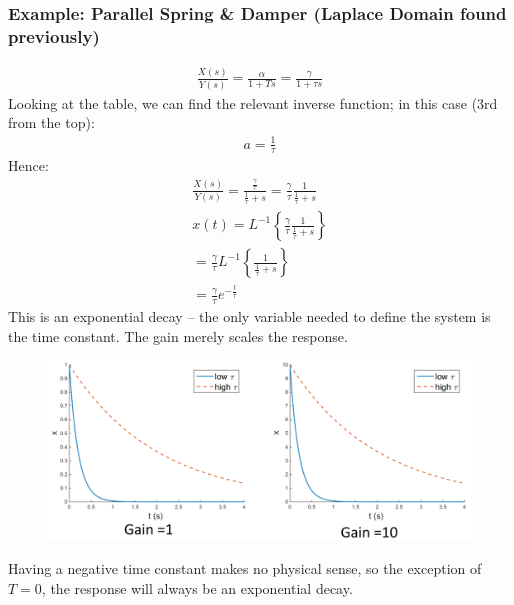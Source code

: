 \documentclass[class=report, crop=false, 12pt,a4paper]{standalone}
\begin{document}
\subsubsection*{Example: Parallel Spring \& Damper (Laplace Domain found previously)}
\begin{gather}
  \frac{X(s)}{Y(s)} = \frac{\alpha}{1+Ts} = \frac{\gamma}{1+\tau s}
\end{gather}
Looking at the table, we can find the relevant inverse function; in this case (3rd from the top):
\begin{gather}
  a = \frac{1}{\tau}
\end{gather}
Hence:
\begin{gather}
  \frac{X(s)}{Y(s)} = \frac{\frac{\gamma}{\tau}}{\frac{1}{\tau}+s} = \frac{\gamma}{\tau}\frac{1}{\frac{1}{\tau}+s} \\
  x(t) = L^{-1}\left\{\frac{\gamma}{\tau}\frac{1}{\frac{1}{\tau}+s}\right\} \\
  = \frac{\gamma}{\tau}L^{-1}\left\{\frac{1}{\frac{1}{\tau}+s}\right\} \\
  = \frac{\gamma}{\tau}e^{-\frac{t}{\tau}}
\end{gather}
This is an exponential decay – the only variable needed to define the system is the time constant. The gain merely scales the response.
\begin{figure}[H]
  \centering
  \includegraphics[width = 0.9 \textwidth]{../img/graphs6.PNG}
\end{figure}
Having a negative time constant makes no physical sense, so the exception of $T=0$, the response will always be an exponential decay.
\end{document}
